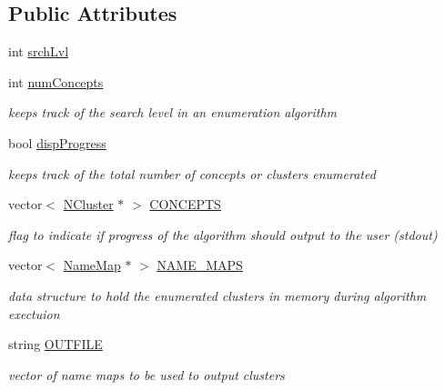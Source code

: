\subsection*{Public Attributes}
\begin{DoxyCompactItemize}
\item 
int \hyperlink{class_lattice_algos_a7061dd2e2590fa24e0dfb16f28509dce}{srchLvl}
\item 
int \hyperlink{class_lattice_algos_a8a6e4d766e7f93a288e015e93b3183a0}{numConcepts}
\begin{DoxyCompactList}\small\item\em keeps track of the search level in an enumeration algorithm \item\end{DoxyCompactList}\item 
bool \hyperlink{class_lattice_algos_a7c599d38a3a66b926d7345153ca2e93c}{dispProgress}
\begin{DoxyCompactList}\small\item\em keeps track of the total number of concepts or clusters enumerated \item\end{DoxyCompactList}\item 
vector$<$ \hyperlink{class_n_cluster}{NCluster} $\ast$ $>$ \hyperlink{class_lattice_algos_a006fbb44cdb89ab949bc9f47ed20a6d3}{CONCEPTS}
\begin{DoxyCompactList}\small\item\em flag to indicate if progress of the algorithm should output to the user (stdout) \item\end{DoxyCompactList}\item 
vector$<$ \hyperlink{class_name_map}{NameMap} $\ast$ $>$ \hyperlink{class_lattice_algos_a242b1f9b2ec58cec08c4c5c074c0c1e7}{NAME\_\-MAPS}
\begin{DoxyCompactList}\small\item\em data structure to hold the enumerated clusters in memory during algorithm exectuion \item\end{DoxyCompactList}\item 
string \hyperlink{class_lattice_algos_aaf79cc2e8513fd28bf1e9329c3e678ab}{OUTFILE}
\begin{DoxyCompactList}\small\item\em vector of name maps to be used to output clusters \item\end{DoxyCompactList}\item 

\end{DoxyCompactItemize}
